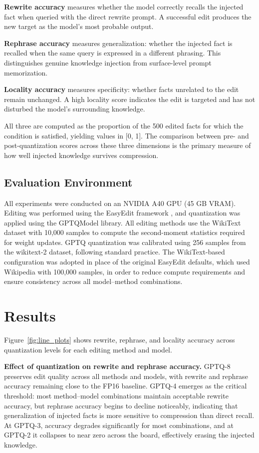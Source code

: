 \documentclass[conference]{IEEEtran}
\begin{document}
\textbf{Rewrite accuracy} measures whether the model correctly recalls the injected fact when queried with the direct rewrite prompt. A successful edit produces the new target as the model's most probable output.

\textbf{Rephrase accuracy} measures generalization: whether the injected fact is recalled when the same query is expressed in a different phrasing. This distinguishes genuine knowledge injection from surface-level prompt memorization.

\textbf{Locality accuracy} measures specificity: whether facts unrelated to the edit remain unchanged. A high locality score indicates the edit is targeted and has not disturbed the model's surrounding knowledge.

All three are computed as the proportion of the 500 edited facts for which the condition is satisfied, yielding values in [0, 1]. The comparison between pre- and post-quantization scores across these three dimensions is the primary measure of how well injected knowledge survives compression.

\subsection{Evaluation Environment}

All experiments were conducted on an NVIDIA A40 GPU (45 GB VRAM). Editing was performed using the EasyEdit framework \cite{b12}, and quantization was applied using the GPTQModel library. All editing methods use the WikiText dataset with 10,000 samples to compute the second-moment statistics required for weight updates. GPTQ quantization was calibrated using 256 samples from the wikitext-2 dataset, following standard practice. The WikiText-based configuration was adopted in place of the original EasyEdit defaults, which used Wikipedia with 100,000 samples, in order to reduce compute requirements and ensure consistency across all model--method combinations.

\section{Results}

Figure~\ref{fig:line_plots} shows rewrite, rephrase, and locality accuracy across quantization levels for each editing method and model.

\textbf{Effect of quantization on rewrite and rephrase accuracy.}
GPTQ-8 preserves edit quality across all methods and models, with rewrite and rephrase accuracy remaining close to the FP16 baseline. GPTQ-4 emerges as the critical threshold: most method--model combinations maintain acceptable rewrite accuracy, but rephrase accuracy begins to decline noticeably, indicating that generalization of injected facts is more sensitive to compression than direct recall. At GPTQ-3, accuracy degrades significantly for most combinations, and at GPTQ-2 it collapses to near zero across the board, effectively erasing the injected knowledge.
\end{document}
